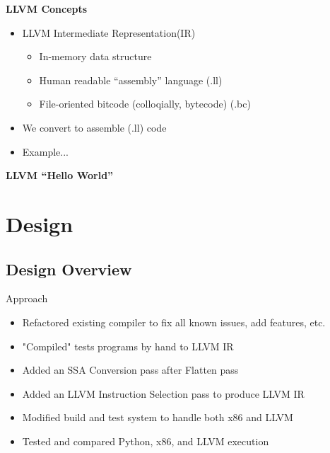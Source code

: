 \documentclass{beamer}
\begin{document}
\begin{frame}{\bf LLVM Concepts}
  \begin{itemize}
  \item<1->LLVM Intermediate Representation(IR)
  \begin{itemize}
  \item<2->In-memory data structure
  \item<3->Human readable ``assembly'' language (.ll)
  \item<4->File-oriented bitcode (colloqially, bytecode) (.bc)
  \end{itemize}
  \item<5->We convert to assemble (.ll) code
  \item<6->Example...
  \end{itemize}
\end{frame}

\begin{frame}{\bf LLVM ``Hello World''}
  
\end{frame}


\section{Design}

\subsection{Design Overview}

\begin{frame}{Approach}
  \begin{itemize}
  \item<1->Refactored existing compiler to fix all known issues, add
    features, etc.
  \item<2->"Compiled" tests programs by hand to LLVM IR
  \item<3->Added an SSA Conversion pass after Flatten pass
  \item<4->Added an LLVM Instruction Selection pass to produce LLVM IR
  \item<5->Modified build and test system to handle both x86 and LLVM
  \item<6->Tested and compared Python, x86, and LLVM execution
  \end{itemize}
\end{frame}
\end{document}
